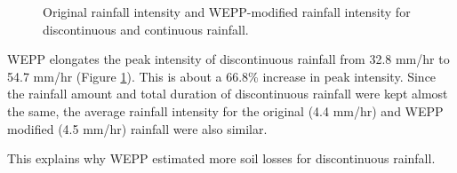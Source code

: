 \begin{figure}[htbp]
  \centering
  \caption{Original rainfall intensity and WEPP-modified rainfall intensity for
discontinuous and continuous rainfall.}
  \label{fig:intensity_discontinuous_and_continuous}
\end{figure}

WEPP elongates the peak intensity of discontinuous rainfall from 32.8 mm/hr to
54.7 mm/hr (Figure \ref{fig:intensity_discontinuous_and_continuous}). This is
about a 66.8\% increase in peak intensity. Since the rainfall amount and total
duration of discontinuous rainfall were kept almost the same, the average
rainfall intensity for the original (4.4 mm/hr) and WEPP modified (4.5 mm/hr)
rainfall were also similar.

This explains why WEPP estimated more soil losses for discontinuous rainfall.

%
%
%


